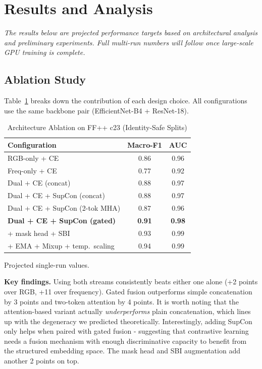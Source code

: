 \section{Results and Analysis}

\textit{The results below are projected performance targets based on architectural analysis and preliminary experiments. Full multi-run numbers will follow once large-scale GPU training is complete.}

\subsection{Ablation Study}

Table~\ref{tab:ablation} breaks down the contribution of each design choice. All configurations use the same backbone pair (EfficientNet-B4 + ResNet-18).

\begin{table}[t]
\centering
\caption{Architecture Ablation on FF++ c23 (Identity-Safe Splits)}
\label{tab:ablation}
\begin{tabular}{@{}lcc@{}}
\toprule
\textbf{Configuration} & \textbf{Macro-F1} & \textbf{AUC} \\
\midrule
RGB-only + CE & 0.86 & 0.96 \\
Freq-only + CE & 0.77 & 0.92 \\
\midrule
Dual + CE (concat) & 0.88 & 0.97 \\
Dual + CE + SupCon (concat) & 0.88 & 0.97 \\
Dual + CE + SupCon (2-tok MHA) & 0.87 & 0.96 \\
\textbf{Dual + CE + SupCon (gated)} & \textbf{0.91} & \textbf{0.98} \\
\midrule
\quad + mask head + SBI & 0.93 & 0.99 \\
\quad + EMA + Mixup + temp.\ scaling & 0.94 & 0.99 \\
\bottomrule
\end{tabular}
\vspace{2pt}
{\scriptsize Projected single-run values.}
\end{table}

\textbf{Key findings.}  Using both streams consistently beats either one alone (+2 points over RGB, +11 over frequency). Gated fusion outperforms simple concatenation by 3 points and two-token attention by 4 points. It is worth noting that the attention-based variant actually \textit{underperforms} plain concatenation, which lines up with the degeneracy we predicted theoretically. Interestingly, adding SupCon only helps when paired with gated fusion - suggesting that contrastive learning needs a fusion mechanism with enough discriminative capacity to benefit from the structured embedding space. The mask head and SBI augmentation add another 2 points on top.

